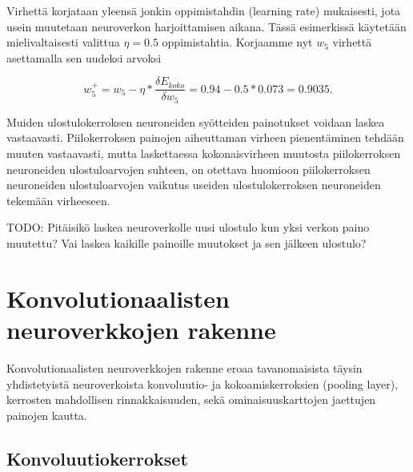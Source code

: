 \documentclass[finnish]{tktltiki2}
\theoremstyle{definition}
\theoremstyle{remark}
\begin{document}
  Virhettä korjataan yleensä jonkin oppimistahdin (learning rate) mukaisesti, jota usein muutetaan neuroverkon harjoittamisen aikana. Tässä esimerkissä käytetään mielivaltaisesti valittua $\eta = 0.5$ oppimistahtia. Korjaamme nyt $w_5$ virhettä asettamalla sen uudeksi arvoksi

  $$w_{5}^+ = w_5 - \eta * \frac{\delta E_{koko}}{\delta w_5} = 0.94 - 0.5 * 0.073 = 0.9035.$$

  Muiden ulostulokerroksen neuroneiden syötteiden painotukset voidaan laskea vastaavasti. Piilokerroksen painojen aiheuttaman virheen pienentäminen tehdään muuten vastaavasti, mutta laskettaessa kokonaisvirheen muutosta piilokerroksen neuroneiden ulostuloarvojen suhteen, on otettava huomioon piilokerroksen neuroneiden ulostuloarvojen vaikutus useiden ulostulokerroksen neuroneiden tekemään virheeseen.

  TODO: Pitäisikö laskea neuroverkolle uusi ulostulo kun yksi verkon paino muutettu? Vai laskea kaikille painoille muutokset ja sen jälkeen ulostulo?



  
  \section{Konvolutionaalisten neuroverkkojen rakenne}
    Konvolutionaalisten neuroverkkojen rakenne eroaa tavanomaisista täysin yhdistetyistä neuroverkoista konvoluutio- ja kokoamiskerroksien (pooling layer), kerrosten mahdollisen rinnakkaisuuden, sekä ominaisuuskarttojen jaettujen painojen kautta.   
    

    \subsection{Konvoluutiokerrokset}
    \label{chap:convolutional-layers}
\end{document}
